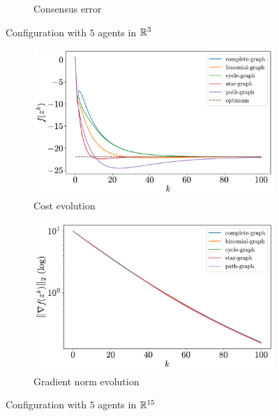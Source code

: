 \documentclass[a4paper,11pt,oneside]{book}
\begin{document}
\begin{figure}[ht]
\begin{subfigure}[t]{0.49\textwidth}
            \caption{Consensus error}
      \end{subfigure}
      \caption{Configuration with $5$ agents in ${\mathbb{R}}^{3}$}
      \label{fig:quadratic_5_3}
\end{figure}

\begin{figure}[ht]
      \centering
      \begin{subfigure}[t]{0.49\textwidth}
            \centering
            \includegraphics[width=\linewidth]{./figs/quadratic/cost_5_15_100.pdf} 
            \caption{Cost evolution}
      \end{subfigure}
      \hfill
      \begin{subfigure}[t]{0.49\textwidth}
            \centering
            \includegraphics[width=\linewidth]{./figs/quadratic/gradient_5_15_100.pdf} 
            \caption{Gradient norm evolution}
      \end{subfigure}
      \caption{Configuration with $5$ agents in ${\mathbb{R}}^{15}$}
      \label{fig:quadratic_5_15}
\end{figure}
\end{document}
